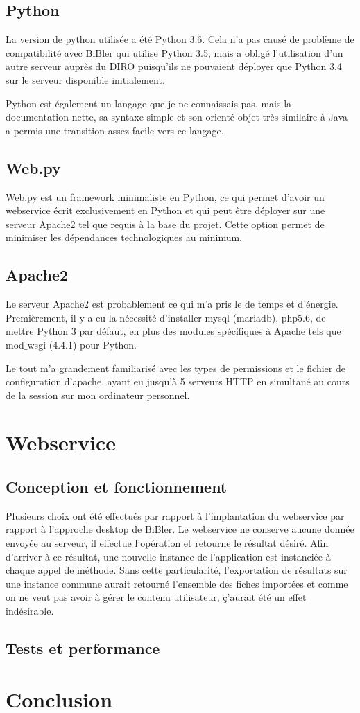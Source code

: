 \documentclass[a4paper,12pt,titlepage]{article}
\begin{document}
\subsection{Python}
La version de python utilisée a été Python 3.6. Cela n'a pas causé de problème de compatibilité avec BiBler qui utilise Python 3.5, mais a obligé l'utilisation d'un autre serveur auprès du DIRO puisqu'ils ne pouvaient déployer que Python 3.4 sur le serveur disponible initialement. \newline

Python est également un langage que je ne connaissais pas, mais la documentation nette, sa syntaxe simple et son orienté objet très similaire à Java a permis une transition assez facile vers ce langage. 
\subsection{Web.py}
Web.py est un framework minimaliste en Python, ce qui permet d'avoir un webservice écrit exclusivement en Python et qui peut être déployer sur une serveur Apache2 tel que requis à la base du projet. Cette option permet de minimiser les dépendances technologiques au minimum.
\subsection{Apache2}
Le serveur Apache2 est probablement ce qui m'a pris le de temps et d'énergie. Premièrement, il y a eu la nécessité d'installer mysql (mariadb), php5.6, de mettre Python 3 par défaut, en plus des modules spécifiques à Apache tels que mod$\_$wsgi (4.4.1) pour Python. \newline

Le tout m'a grandement familiarisé avec les types de permissions et le fichier de configuration d'apache, ayant eu jusqu'à 5 serveurs HTTP en simultané au cours de la session sur mon ordinateur personnel. 
\section{Webservice}
\subsection{Conception et fonctionnement}
Plusieurs choix ont été effectués par rapport à l'implantation du webservice par rapport à l'approche desktop de BiBler. Le webservice ne conserve aucune donnée envoyée au serveur, il effectue l'opération et retourne le résultat désiré. Afin d'arriver à ce résultat, une nouvelle instance de l'application est instanciée à chaque appel de méthode. Sans cette particularité, l'exportation de résultats sur une instance commune aurait retourné l'ensemble des fiches importées et comme on ne veut pas avoir à gérer le contenu utilisateur, ç'aurait été un effet indésirable. 
\subsection{Tests et performance}

\section{Conclusion}
\end{document}
